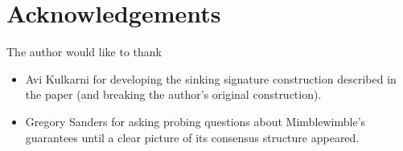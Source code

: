 \documentclass[letterpaper]{article}
\begin{document}
\section{Acknowledgements}

The author would like to thank
\begin{itemize}
\item Avi Kulkarni for developing the sinking signature construction described
in the paper (and breaking the author's original construction).
\item Gregory Sanders for asking probing questions about Mimblewimble's
guarantees until a clear picture of its consensus structure appeared.
\end{itemize}

\nolinenumbers

\clearpage


\end{document}
